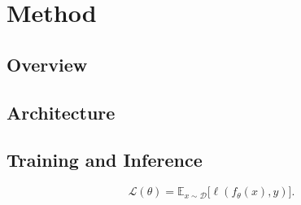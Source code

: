 \section{Method}
\label{sec:method}


\subsection{Overview}
\label{sec:method-overview}


\subsection{Architecture}
\label{sec:method-architecture}


\subsection{Training and Inference}
\label{sec:method-training}


\begin{equation}
\label{eq:method-example}
\mathcal{L}(\theta) = \mathbb{E}_{x \sim \mathcal{D}} \big[ \ell(f_\theta(x), y) \big].
\end{equation}
